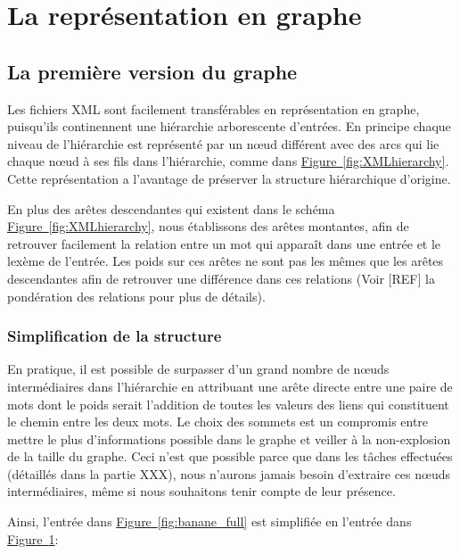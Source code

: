 \section{La représentation en graphe}


\subsection{La première version du graphe}

Les fichiers XML sont facilement transférables en représentation en graphe, 
puisqu'ils continennent une hiérarchie arborescente d'entrées.
En principe chaque niveau de 
l'hiérarchie est représenté par un nœud différent avec des arcs qui lie chaque 
nœud à ses fils dans l'hiérarchie, comme dans 
\hyperref[fig:XMLhierarchy]{Figure~\ref*{fig:XMLhierarchy}}. Cette 
représentation a l'avantage de préserver la structure hiérarchique d'origine.

En plus des arêtes descendantes qui existent dans le schéma 
\hyperref[fig:XMLhierarchy]{Figure~\ref*{fig:XMLhierarchy}}, nous établissons 
des arêtes montantes, afin de retrouver facilement la relation entre un mot qui 
apparaît dans une entrée et le lexème de l'entrée. Les poids sur ces arêtes ne 
sont pas les mêmes que les arêtes descendantes afin de retrouver une différence 
dans ces relations (Voir [REF] la pondération des relations pour plus de détails).


\subsubsection{Simplification de la structure}
En pratique, il est possible de surpasser d'un grand nombre de nœuds 
intermédiaires dans l'hiérarchie en attribuant une arête directe entre une paire 
de mots dont le poids serait l'addition de toutes les valeurs des liens qui 
constituent le chemin entre les deux mots. Le choix des sommets est un compromis 
entre mettre le plus d'informations possible dans le graphe et veiller à la 
non-explosion de la taille du graphe. Ceci n'est que possible parce que dans les 
tâches effectuées (détaillés dans la partie XXX), nous n'aurons jamais besoin 
d'extraire ces nœuds intermédiaires, même si nous souhaitons tenir compte de 
leur présence.

Ainsi, l'entrée dans \hyperref[fig:banane_full]{Figure~\ref*{fig:banane_full}} 
est simplifiée en l'entrée dans 
\hyperref[fig:banane_simple]{Figure~\ref*{fig:banane_simple}}:

\begin{figure}
\centering
\parbox{5cm}{
\def\svgscale{0.5}

\caption{}
\label{fig:banane_full}}
\qquad
\begin{minipage}{5cm}
\def\svgscale{0.5}

\caption{}
\label{fig:banane_simple}
\end{minipage}
\end{figure}

